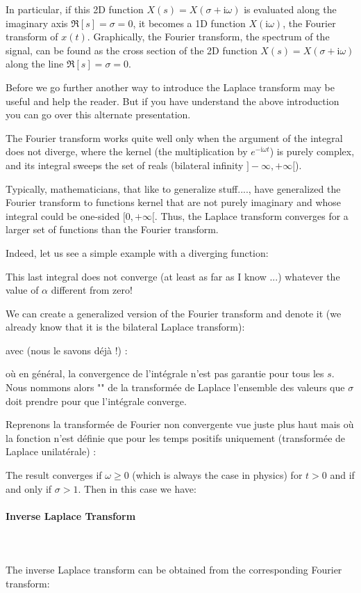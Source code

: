 	In particular, if this 2D function $X(s)=X(\sigma+\mathrm{i}\omega)$ is evaluated along the imaginary axis $\Re[s]=\sigma=0$, it becomes a 1D function $X(\mathrm{i}\omega)$, the	Fourier transform of $x(t)$. Graphically, the Fourier transform, the spectrum of the signal, can be found as the cross section of the 2D function $X(s)=X(\sigma+\mathrm{i}\omega)$ along the line $\Re[s]=\sigma=0$.
	
	Before we go further another way to introduce the Laplace transform may be useful and help the reader. But if you have understand the above introduction you can go over this alternate presentation.
	
	The Fourier transform works quite well only when the argument of the integral does not diverge, where the kernel (the multiplication by $e^{-\mathrm{i}\omega t}$) is purely complex, and its integral sweeps the set of reals (bilateral infinity $]-\infty,+\infty[$).

	Typically, mathematicians, that like to generalize stuff...., have generalized the Fourier transform to functions kernel that are not purely imaginary and whose integral could be one-sided $[0,+\infty[$. Thus, the Laplace transform converges for a larger set of functions than the Fourier transform.
	
	Indeed, let us see a simple example with a diverging function:
	
	This last integral does not converge (at least as far as I know ...) whatever the value of $\alpha$ different from zero!
	
	We can create a generalized version of the Fourier transform and denote it (we already know that it is the bilateral Laplace transform):
	
	avec (nous le savons déjà !) :
	
	où en général, la convergence de l'intégrale n'est pas garantie pour tous les $s$. Nous nommons alors "" de la transformée de Laplace l'ensemble des valeurs que $\sigma$ doit prendre pour que l'intégrale converge.
	
	Reprenons la transformée de Fourier non convergente vue juste plus haut mais où la fonction n'est définie que pour les temps positifs uniquement (transformée de Laplace unilatérale) :
	
	The result converges if $\omega\geq 0$ (which is always the case in physics) for $t>0$ and if and only if $\sigma>1$. Then in this case we have:
	
	
	\paragraph{Inverse Laplace Transform}\mbox{}\\\\
	The inverse Laplace transform can be obtained from the corresponding Fourier	transform:
	
